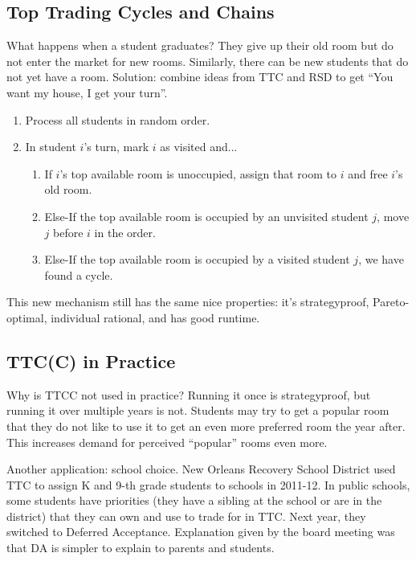 \documentclass[dvipsnames]{article}
\theoremstyle{definition}
\theoremstyle{remark}
\newenvironment{mech}[1]{\begin{tcolorbox}[colback=red!5!white,colframe=red!75!black,title={#1}]}{\end{tcolorbox}}
\begin{document}
\subsection{Top Trading Cycles and Chains}
What happens when a student graduates? They give up their old room but do not enter the market for new rooms. Similarly, there can be new students that do not yet have a room. Solution: combine ideas from TTC and RSD to get ``You want my house, I get your turn''.

\begin{mech}{Top Trading Cycles with Chains}
	\begin{enumerate}
		\item Process all students in random order.
		\item In student $i$'s turn, mark $i$ as visited and...
		\begin{enumerate}
			\item If $i$'s top available room is unoccupied, assign that room to $i$ and free $i$'s old room.
			\item Else-If the top available room is occupied by an unvisited student $j$, move $j$ before $i$ in the order.
			\item Else-If the top available room is occupied by a visited student $j$, we have found a cycle.
		\end{enumerate}
	\end{enumerate}
\end{mech}

This new mechanism still has the same nice properties: it's strategyproof, Pareto-optimal, individual rational, and has good runtime.

\subsection{TTC(C) in Practice}
Why is TTCC not used in practice? Running it once is strategyproof, but running it over multiple years is not. Students may try to get a popular room that they do not like to use it to get an even more preferred room the year after. This increases demand for perceived ``popular'' rooms even more.

Another application: school choice. New Orleans Recovery School District used TTC to assign K and 9-th grade students to schools in 2011-12. In public schools, some students have priorities (they have a sibling at the school or are in the district) that they can own and use to trade for in TTC. Next year, they switched to Deferred Acceptance. Explanation given by the board meeting was that DA is simpler to explain to parents and students. 
\end{document}
